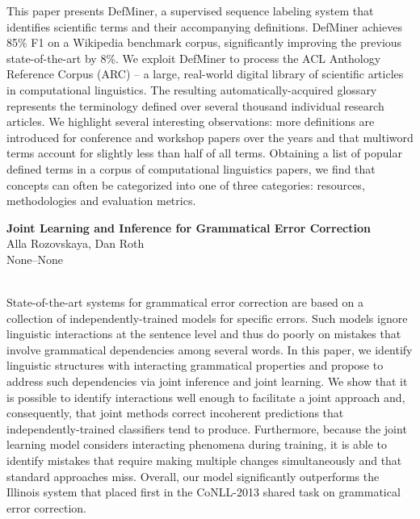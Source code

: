 \documentclass[twoside,makeidx]{book}
\renewcommand{\normalsize}{\fontsize{8}{9}\selectfont}
\renewcommand{\small}{\fontsize{7}{8}\selectfont}
\begin{document}
\nopagebreak%
\noindent%
{\small This paper presents DefMiner, a supervised sequence labeling system that identifies scientific terms and their accompanying definitions. DefMiner achieves 85\% F1 on a Wikipedia benchmark corpus, significantly improving the previous state-of-the-art by 8\%.  We exploit DefMiner to process the ACL Anthology Reference Corpus (ARC) -- a large, real-world digital library of scientific articles in computational linguistics.  The resulting automatically-acquired glossary represents the terminology defined over several thousand individual research articles.  We highlight several interesting observations: more definitions are introduced for conference and workshop papers over the years and that multiword terms account for slightly less than half of all terms. Obtaining a list of popular defined terms in a corpus of computational linguistics papers, we find that concepts can often be categorized into one of three categories: resources, methodologies and evaluation metrics.}
\par\vspace{2em}\noindent%
\begin{minipage}{\linewidth}%
\begin{center}
\textbf{\normalsize Joint Learning and Inference for Grammatical Error Correction}\\
\normalsize  Alla Rozovskaya,  Dan Roth\\
{\small None--None}\\
\end{center}
\end{minipage}\\[0.5em]
\nopagebreak%
\noindent%
{\small State-of-the-art systems for grammatical error correction are based on a collection of independently-trained models for specific errors. Such models ignore linguistic interactions at the sentence level and thus do poorly on mistakes that involve grammatical dependencies among several words. In this paper, we identify linguistic structures with interacting grammatical properties and propose to address such dependencies via joint inference and joint learning.  We show that it is possible to identify interactions well enough to facilitate a joint approach and, consequently, that joint methods correct incoherent predictions that independently-trained classifiers tend to produce. Furthermore, because the joint learning model considers interacting phenomena during training, it is able to identify mistakes that require making multiple changes simultaneously and that standard approaches miss. Overall, our model significantly outperforms the Illinois system that placed first in the CoNLL-2013 shared task on grammatical error correction.}
\end{document}
